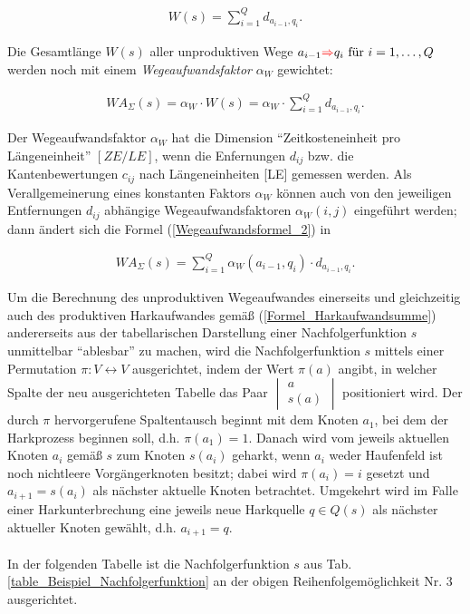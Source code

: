 \documentclass[fontsize=12pt,doubleside,openany,listof=totoc,listof=flat,listof=nochaptergap,numbers=noenddot]{scrbook}
\theoremstyle{style}
\begin{document}
\begin{align}
W(s) = \sum_{i=1}^{Q} d_{a_{i-1},q_i}.
\label{Wegeaufwandsformel_1}
\end{align}	

\noindent Die Gesamtlänge $W(s)$ aller unproduktiven Wege $a_{i-1} \textcolor{red}{\Rightarrow} q_i \text{ für } i=1,\dots,Q$ werden noch mit einem \textit{Wegeaufwandsfaktor}\label{Wegeaufwandsfaktor} $\alpha_W$ gewichtet: 

\begin{align}
WA_{\Sigma}(s) = \alpha_W \cdot W(s) = \alpha_W \cdot \sum_{i=1}^{Q} d_{a_{i-1},q_i}.
\label{Wegeaufwandsformel_2}
\end{align}	

\noindent Der Wegeaufwandsfaktor $\alpha_W$ hat die Dimension "`Zeitkosteneinheit pro Längeneinheit"' $[ZE/LE]$, wenn die Enfernungen $d_{ij}$ bzw. die Kantenbewertungen $c_{ij}$ nach Längeneinheiten [LE] gemessen werden. Als Verallgemeinerung eines konstanten Faktors $\alpha_W$ können auch von den jeweiligen Entfernungen $d_{ij}$ abhängige Wegeaufwandsfaktoren $\alpha_W(i,j)$ eingeführt werden; dann ändert sich die Formel (\ref{Wegeaufwandsformel_2}) in 

\begin{align}
WA_{\Sigma}(s) = \sum_{i=1}^{Q}  \alpha_W(a_{i-1},q_i) \cdot d_{a_{i-1},q_i}.
\label{Wegeaufwandsformel_3}
\end{align}	

\noindent Um die Berechnung des unproduktiven Wegeaufwandes einerseits und gleichzeitig auch des produktiven Harkaufwandes gemäß (\ref{Formel_Harkaufwandsumme}) andererseits aus der tabellarischen Darstellung einer Nachfolgerfunktion $s$ unmittelbar "`ablesbar"' zu machen, wird die Nachfolgerfunktion $s$ mittels einer Permutation $\pi : V \leftrightarrow V$ ausgerichtet\label{Ausrichtung}, indem der Wert $\pi(a)$ angibt, in welcher Spalte der neu ausgerichteten Tabelle das Paar $\begin{vmatrix} a\\s(a) \end{vmatrix}$ positioniert wird. Der durch $\pi$ hervorgerufene Spaltentausch beginnt mit dem Knoten $a_1$, bei dem der Harkprozess beginnen soll, d.h. $\pi(a_1) = 1$. Danach wird vom jeweils aktuellen Knoten $a_i$ gemäß $s$ zum Knoten $s(a_i)$ geharkt, wenn $a_i$ weder Haufenfeld ist noch nichtleere Vorgängerknoten besitzt; dabei wird $\pi(a_i)=i$ gesetzt und $a_{i+1}=s(a_i)$ als nächster aktuelle Knoten betrachtet. Umgekehrt wird im Falle einer Harkunterbrechung eine jeweils neue Harkquelle $q \in Q(s)$ als nächster aktueller Knoten gewählt, d.h. $a_{i+1} = q$. \\
\\
In der folgenden Tabelle ist die Nachfolgerfunktion $s$ aus Tab. \ref{table_Beispiel_Nachfolgerfunktion} an der obigen Reihenfolgemöglichkeit Nr. 3 ausgerichtet. 
\end{document}
